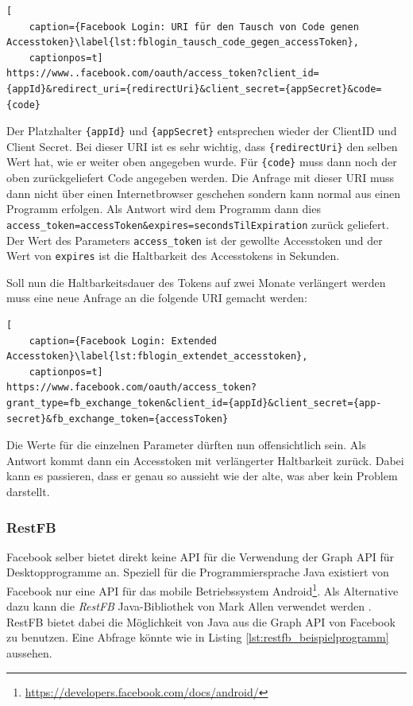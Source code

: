 \begin{lstlisting}[
    caption={Facebook Login: URI für den Tausch von Code genen Accesstoken}\label{lst:fblogin_tausch_code_gegen_accessToken},
    captionpos=t]
https://www..facebook.com/oauth/access_token?client_id={appId}&redirect_uri={redirectUri}&client_secret={appSecret}&code={code}
\end{lstlisting}

Der Platzhalter \texttt{\{appId\}} und \texttt{\{appSecret\}} entsprechen wieder der ClientID und Client Secret. Bei dieser URI ist es sehr wichtig, dass \texttt{\{redirectUri\}} den selben Wert hat, wie er weiter oben angegeben wurde. Für \texttt{\{code\}} muss dann noch der oben zurückgeliefert Code angegeben werden. Die Anfrage mit dieser URI muss dann nicht über einen Internetbrowser geschehen sondern kann normal aus einen Programm erfolgen. Als Antwort wird dem Programm dann dies \texttt{access\_token={accessToken}\&expires={secondsTilExpiration}} zurück geliefert. Der Wert des Parameters \texttt{access\_token} ist der gewollte Accesstoken und der Wert von \texttt{expires} ist die Haltbarkeit des Accesstokens in Sekunden.

Soll nun die Haltbarkeitsdauer des Tokens auf zwei Monate verlängert werden muss eine neue Anfrage an die folgende URI gemacht werden:

\begin{lstlisting}[
    caption={Facebook Login: Extended Accesstoken}\label{lst:fblogin_extendet_accesstoken},
    captionpos=t]
https://www.facebook.com/oauth/access_token?grant_type=fb_exchange_token&client_id={appId}&client_secret={app-secret}&fb_exchange_token={accessToken}
\end{lstlisting} 

Die Werte für die einzelnen Parameter dürften nun offensichtlich sein. Als Antwort kommt dann ein Accesstoken mit verlängerter Haltbarkeit zurück. Dabei kann es passieren, dass er genau so aussieht wie der alte, was aber kein Problem darstellt.



\subsubsection{RestFB} %
\label{ssub:restfb}

Facebook selber bietet direkt keine API für die Verwendung der Graph API für Desktopprogramme an. Speziell für die Programmiersprache Java existiert von Facebook nur eine API für das mobile Betriebssystem Android\footnote{\url{https://developers.facebook.com/docs/android/}}. Als Alternative dazu kann die \emph{RestFB} Java-Bibliothek von Mark Allen verwendet werden \cite{MarkAllenRestFB}. RestFB bietet dabei die Möglichkeit von Java aus die Graph API von Facebook zu benutzen. Eine Abfrage könnte wie in Listing \ref{lst:restfb_beispielprogramm} aussehen.

